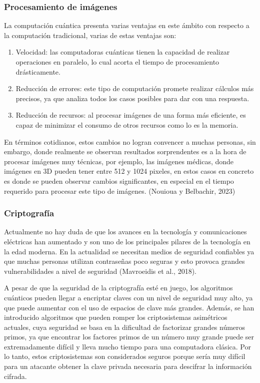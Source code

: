 \documentclass[twoside]{article}
\begin{document}
\subsubsection{Procesamiento de imágenes} 
La computación cuántica presenta varias ventajas en este ámbito con respecto a la computación tradicional, varias de estas ventajas son: 
\begin{enumerate}
    \item Velocidad: las computadoras cuánticas tienen la capacidad de realizar operaciones en paralelo, lo cual acorta el tiempo de procesamiento drásticamente.

    \item Reducción de errores: este tipo de computación promete realizar cálculos más precisos, ya que analiza todos los casos posibles para dar con una respuesta.

    \item Reducción de recursos: al procesar imágenes de una forma más eficiente, es capaz de minimizar el consumo de otros recursos como lo es la memoria.
\end{enumerate}

En términos cotidianos, estos cambios no logran convencer a muchas personas, sin embargo, donde realmente se observan resultados sorprendentes es a la hora de procesar imágenes muy técnicas, por ejemplo, las imágenes médicas, donde imágenes en 3D pueden tener entre 512 y 1024 pixeles, en estos casos en concreto es donde se pueden observar cambios significantes, en especial en el tiempo requerido para procesar este tipo de imágenes. (Nouioua y Belbachir, 2023)

\subsubsection{Criptografía}
Actualmente no hay duda de que los avances en la tecnología y comunicaciones eléctricas han aumentado y son uno de los principales pilares de la tecnología en la edad moderna. En la actualidad se necesitan medios de seguridad confiables ya que muchas personas utilizan contraseñas poco seguras y esto provoca grandes vulnerabilidades a nivel de seguridad (Mavroeidis et al., 2018). 

A pesar de que la seguridad de la criptografía esté en juego, los algoritmos cuánticos pueden llegar a encriptar claves con un nivel de seguridad muy alto, ya que puede aumentar con el uso de espacios de clave más grandes. Además, se han introducido algoritmos que pueden romper los criptosistemas asimétricos actuales, cuya seguridad se basa en la dificultad de factorizar grandes números primos, ya que encontrar los factores primos de un número muy grande puede ser extremadamente difícil y lleva mucho tiempo para una computadora clásica. Por lo tanto, estos criptosistemas son considerados seguros porque sería muy difícil para un atacante obtener la clave privada necesaria para descifrar la información cifrada. 
\end{document}
